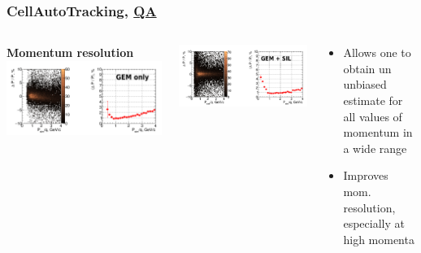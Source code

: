 \documentclass[dvipsnames, aspectratio=43] {beamer}
\begin{document}
\begin{frame}
  \bf
  \frametitle{\bf \centering CellAutoTracking, \underline{QA}}
  \begin{columns}[c]
    \begin{block}{\bf \centering Momentum resolution}
      \includegraphics[width=1.\linewidth]{momRes_yesField_noSil.png}
    \end{block}
    \begin{block}{}
      \includegraphics[width=1.\linewidth]{momRes_yesField_yesSil.png}
    \end{block}
    \begin{block}{\bf {}}
      \begin{itemize}
      \item Allows one to obtain un unbiased estimate for all values of momentum in a wide range
      \item Improves mom. resolution, especially at high momenta 
      \end{itemize}
    \end{block}
  \end{columns}
\end{frame}
\end{document}

